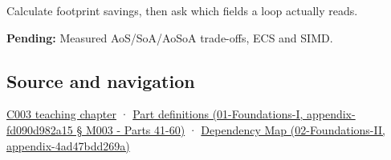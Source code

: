 Calculate footprint savings, then ask which fields a loop actually reads.

\textbf{Pending:} Measured AoS/SoA/AoSoA trade-offs, ECS and SIMD.

\subsection{Source and navigation}\label{source-and-navigation}

\href{Continuous\%20Notes/Computing\%20Foundations\%20-\%20From\%20Bits\%20to\%20C++\%20and\%20Systems\%20APIs\#Where\%20the\%20bytes\%20live}{C003 teaching chapter} · \href{}{Part definitions (01-Foundations-I, appendix-fd090d982a15 § M003 - Parts 41-60)} · \href{}{Dependency Map (02-Foundations-II, appendix-4ad47bdd269a)}
